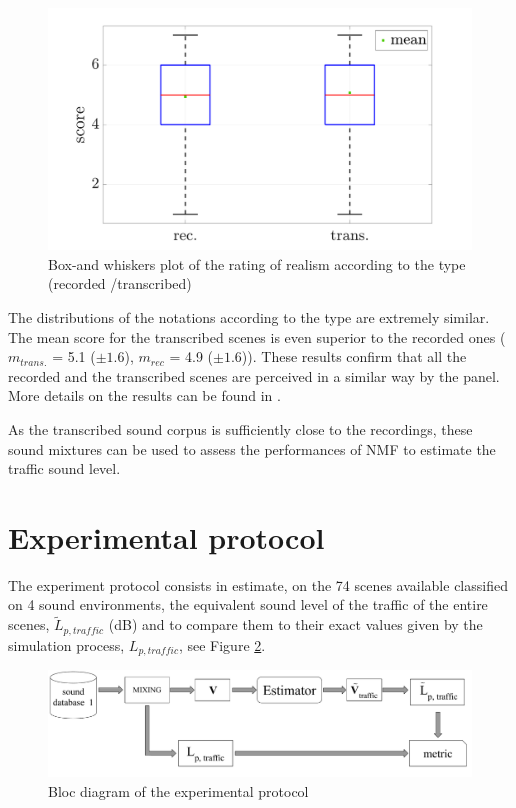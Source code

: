 \documentclass[review,5p,twocolumn,sort&compress,times]{elsarticle}
\begin{document}
\begin{figure}[t]
\centering
\includegraphics[width=\linewidth]{figures/testPerceptif_boxplotType_EN.pdf} 
\caption{Box-and whiskers plot of the rating of realism according to the type (recorded /transcribed)}
\label{fig:boxPlot_test}
\end{figure}

The distributions of the notations according to the type are extremely similar. The mean score for the transcribed scenes is even superior to the recorded ones ($m_{trans.}$ = 5.1 ($\pm 1.6$), $m_{rec}$ = 4.9 ($\pm 1.6$)). These results confirm that all the recorded and the transcribed scenes are perceived in a similar way by the panel. More details on the results can be found in  \cite{gloaguen_creation_2017}. 

As the transcribed sound corpus is sufficiently close to the recordings, these sound mixtures can be used to assess the performances of NMF to estimate the traffic sound level.

\section{Experimental protocol}\label{part:expProtocol}

The experiment protocol consists in estimate, on the 74 scenes available classified on 4 sound environments, the equivalent sound level of the traffic of the entire scenes, $\tilde{L}_{p, traffic}$ (dB) and to compare them to their exact values given by the simulation process, $L_{p,traffic}$, see Figure \ref{fig:bloc_diagram_estimator}. 

\begin{figure}[t]
\centering
\includegraphics[width=.9\linewidth]{figures/bloc_diagram_estimator.pdf}
\caption{Bloc diagram of the experimental protocol}
\label{fig:bloc_diagram_estimator}
\end{figure}
\end{document}
